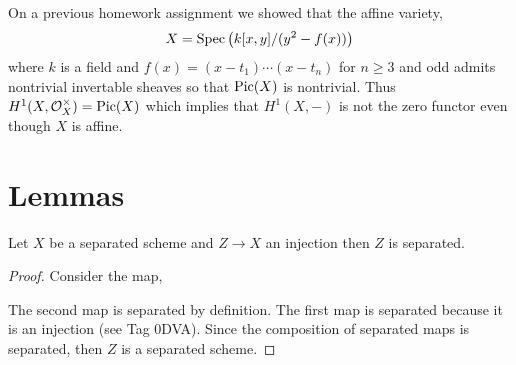\documentclass[12pt]{article}
\begin{document}
On a previous homework assignment we showed that the affine variety,
\[ X   = \mathrm{Spec}\left( k[x,y] / (y^2 - f(x)) \right) \]
where $k$ is a field and $f(x) = (x - t_1) \cdots (x - t_n)$ for $n \ge 3$ and odd admits nontrivial invertable sheaves so that $\mathrm{Pic}(X)$ is nontrivial. Thus $H^1(X, \mathcal{O}_{X}^\times) = \mathrm{Pic}(X)$ which implies that $H^1(X, -)$ is not the zero functor even though $X$ is affine. 

\newpage

\section{Lemmas}

\begin{lemma} \label{subset_separated}
Let $X$ be a separated scheme and $Z \to X$ an injection then $Z$ is separated.
\end{lemma}

\begin{proof}
Consider the map,
\begin{center}
\end{center}
The second map is separated by definition. The first map is separated because it is an injection (see Tag 0DVA). Since the composition of separated maps is separated, then $Z$ is a separated scheme. 
\end{proof}
\end{document}
